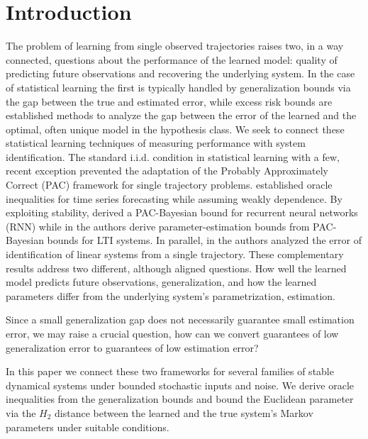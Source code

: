 \documentclass{ifacconf}
\begin{document}
\section{Introduction}

The problem of learning from single observed trajectories raises two, in a way connected, questions about the performance of the learned model: quality of predicting future observations and recovering the underlying system. In the case of statistical learning the first is typically handled by generalization bounds via the gap between the true and estimated error, while excess risk bounds are established methods to analyze the gap between the error of the learned and the optimal, often unique model in the hypothesis class. We seek to connect these statistical learning techniques of measuring performance with system identification. The standard i.i.d. condition in statistical learning with a few, recent exception prevented the adaptation of the Probably Approximately Correct (PAC) framework for single trajectory problems. \citet{alquier2013prediction} established oracle inequalities for time series forecasting while assuming weakly dependence. By exploiting stability, \citet{eringis2023pacbayesRNN} derived a PAC-Bayesian bound for recurrent neural networks (RNN) while in \citet{Nips2026} the authors derive parameter-estimation bounds from PAC-Bayesian bounds for LTI systems. In parallel, in \citet{Simchowitz_Mania_Tu_Jordan_Recht_2018} the authors analyzed the error of identification of linear systems from a single trajectory. These complementary results address two different, although aligned questions. How well the learned model predicts future observations, generalization, and how the learned parameters differ from the underlying system's parametrization, estimation.  

Since a small generalization gap does not necessarily guarantee small estimation error, we may raise a crucial question, how can we convert guarantees of low generalization error to guarantees of low estimation error?

In this paper we connect these two frameworks for several families of stable dynamical systems under bounded stochastic inputs and noise. We derive oracle inequalities from the generalization bounds and bound the Euclidean parameter via the $H_2$ distance between the learned and the true system's Markov parameters under suitable conditions. 
\end{document}
